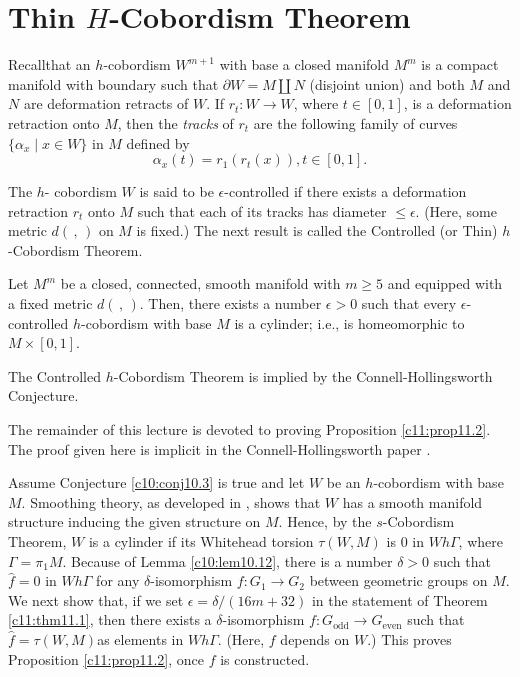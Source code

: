 \chapter{Thin $H$-Cobordism Theorem}\label{c11}

Recall\pageoriginale that an $h$-cobordism $W^{m+1}$ with base a closed manifold
$M^m$ is a compact manifold with boundary such that $\partial W = M
\amalg N$ (disjoint union) and both $M$ and $N$ are deformation
retracts of $W$. If $r_t : W \to W$, where $t \in [0, 1]$, is a
deformation retraction onto $M$, then the \textit{tracks} of $r_t$ are
the following family of curves $\{ \alpha_x\mid x \in W\}$ in $M$
defined by 
$$
\alpha_x (t) = r_1 (r_t (x)), t \in [0, 1].
$$

The $h$- cobordism $W$ is said to be $\epsilon$-controlled if there
exists a deformation retraction $r_t$ onto $M$ such that each of its
tracks has diameter $\leq \epsilon$. (Here, some metric $d(\,,\,)$ on $M$
is fixed.) The next result is called the Controlled (or Thin)
$h$-Cobordism Theorem.

\begin{thm}\label{c11:thm11.1}
  Let $M^m$ be a closed, connected, smooth manifold with $m \geq 5$
  and equipped with a fixed metric $d(\,,\,)$. Then, there exists a number
  $\epsilon > 0$ such that every $\epsilon$-controlled $h$-cobordism
  with base $M$ is a cylinder; i.e., is homeomorphic to $M \times [0,1]$.
\end{thm}

\begin{prop}\label{c11:prop11.2}
  The Controlled $h$-Cobordism Theorem is implied by the
  Connell-Hollingsworth Conjecture.
\end{prop}

The remainder of this lecture is devoted to proving Proposition
\ref{c11:prop11.2}. The proof given here is implicit in the
Connell-Hollingsworth paper \cite{20}.

Assume Conjecture \ref{c10:conj10.3} is true and let $W$ be an
$h$-cobordism with base $M$. Smoothing theory, as developed in
\cite{67}, shows that $W$ has a smooth manifold structure inducing the
given structure on $M$. Hence, by the $s$-Cobordism Theorem, $W$ is a
cylinder if its Whitehead torsion $\tau (W, M)$ is 0 in $Wh\Gamma$,
where $\Gamma = \pi_1 M$. Because of Lemma \ref{c10:lem10.12}, there
is a number $\delta > 0$ such that $\hat{f} =0$ in $Wh\Gamma$ for any
$\delta$-isomorphism $f: G_1 \to G_2$ between geometric groups on
$M$. We next show that, if we set $\epsilon = \delta/(16m + 32)$ in
the statement of Theorem \ref{c11:thm11.1}, then there exists a
$\delta$-isomorphism $f: G_{\text{odd}} \to G_{\text{even}}$ such that
$\hat{f} = \tau (W, M)$\pageoriginale as elements in
$Wh\Gamma$. (Here, $f$ depends on $W$.) This proves Proposition
\ref{c11:prop11.2}, once $f$ is constructed.

